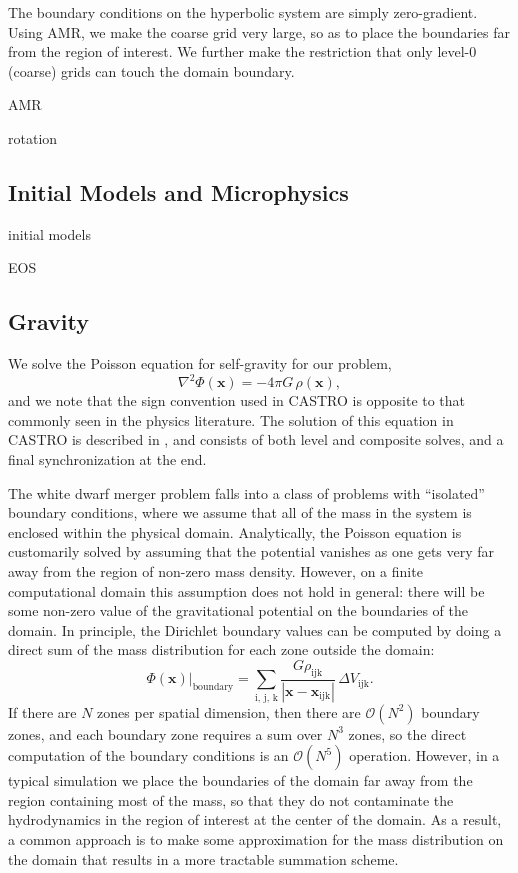 \documentclass[12pt,preprint]{aastex}
\begin{document}
The boundary conditions on the hyperbolic system are simply
zero-gradient.  Using AMR, we make the coarse grid very large, so as
to place the boundaries far from the region of interest.  We further
make the restriction that only level-0 (coarse) grids can touch the
domain boundary.



AMR

rotation


\subsection{Initial Models and Microphysics}

initial models

EOS


\subsection{Gravity}

We solve the Poisson equation for self-gravity for our problem,
\begin{equation}
  \nabla^2 \Phi(\mathbf{x}) = -4\pi G\, \rho(\mathbf{x}),
\end{equation}
and we note that the sign convention used in CASTRO is opposite to that commonly seen in the physics literature. The solution of this equation in CASTRO is described in \cite{castro}, and consists of both level and composite solves, and a final synchronization at the end.

The white dwarf merger problem falls into a class of problems with ``isolated'' boundary conditions, where we assume that all of the mass in the system is enclosed within the physical domain. Analytically, the Poisson equation is customarily solved by assuming that the potential vanishes as one gets very far away from the region of non-zero mass density. However, on a finite computational domain this assumption does not hold in general: there will be some non-zero value of the gravitational potential on the boundaries of the domain. In principle, the Dirichlet boundary values can be computed by doing a direct sum of the mass distribution for each zone outside the domain:
\begin{equation}
  \left. \Phi(\mathbf{x}) \right|_{\text{boundary}} = \sum_{\text{i, j, k}} \frac{G \rho_{\text{ijk}}}{|\mathbf{x} - \mathbf{x}_{\text{ijk}}|}\, \Delta V_{\text{ijk}}.
\end{equation}
If there are $N$ zones per spatial dimension, then there are $\mathcal{O}(N^2)$ boundary zones, and each boundary zone requires a sum over $N^3$ zones, so the direct computation of the boundary conditions is an $\mathcal{O}(N^5)$ operation. However, in a typical simulation we place the boundaries of the domain far away from the region containing most of the mass, so that they do not contaminate the hydrodynamics in the region of interest at the center of the domain. As a result, a common approach is to make some approximation for the mass distribution on the domain that results in a more tractable summation scheme. 
\end{document}
